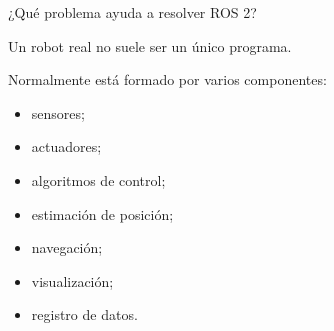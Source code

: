 \documentclass[aspectratio=169]{beamer}
\begin{document}
\begin{frame}{¿Qué problema ayuda a resolver ROS 2?}

    Un robot real no suele ser un único programa.

    Normalmente está formado por varios componentes:

    \begin{itemize}
        \item sensores;
        \item actuadores;
        \item algoritmos de control;
        \item estimación de posición;
        \item navegación;
        \item visualización;
        \item registro de datos.
    \end{itemize}

    \vspace{0.3cm}


\end{frame}
\end{document}
